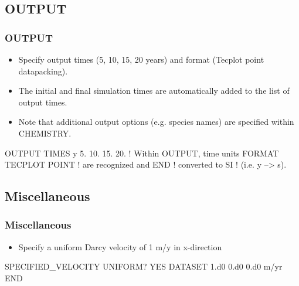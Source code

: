 \documentclass{beamer}
\newcommand\redcomment[1]{{{\color{red} #1}}}
\newcommand\bluecomment[1]{{{\color{blue} #1}}}
\newcommand\greencomment[1]{{{\color{green} #1}}}
\begin{document}
\subsection{OUTPUT}

\begin{frame}[fragile]\frametitle{OUTPUT}

\begin{itemize}
\item Specify output times (5, 10, 15, 20 years) and format (Tecplot point datapacking).
\item The initial and final simulation times are automatically added to the list of output times.
\item Note that additional output options (e.g. species names) are specified within CHEMISTRY.
\end{itemize}


\begin{semiverbatim}

OUTPUT
  TIMES \redcomment{y} 5. 10. 15. 20.  \bluecomment{! Within OUTPUT, time units}
  FORMAT TECPLOT POINT    \bluecomment{! are recognized and}
END                       \bluecomment{! converted to SI}
                          \bluecomment{! (i.e. \redcomment{y} --> \greencomment{s}).}
\end{semiverbatim}

\end{frame}

\subsection{Miscellaneous}

\begin{frame}[fragile]\frametitle{Miscellaneous}

\begin{itemize}
\item Specify a uniform Darcy velocity of 1 m/y in x-direction
\end{itemize}


\begin{semiverbatim}

SPECIFIED_VELOCITY
  UNIFORM? YES
  DATASET 1.d0 0.d0 0.d0 m/yr
END
\end{semiverbatim}

\end{frame}
\end{document}
